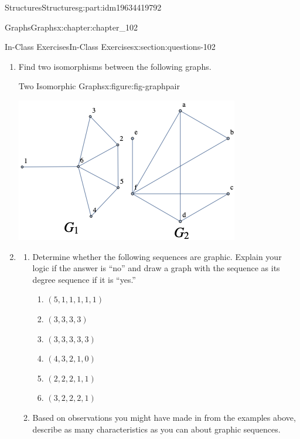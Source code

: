 \documentclass[oneside,10pt,]{book}
\numberwithin{equation}{section}
\begin{document}
\begin{partptx}{Structures}{}{Structures}{}{}{g:part:idm19634419792}
\begin{chapterptx}{Graphs}{}{Graphs}{}{}{x:chapter:chapter_102}
\begin{sectionptx}{In-Class Exercises}{}{In-Class Exercises}{}{}{x:section:questions-102}
\begin{enumerate}[label=\arabic*.]
\begin{figureptx}{A model for bit strings with no consecutive 1's}{x:figure:fig-directed-graph-ex1}{}
\begin{image}{0.15}{0.7}{0.15}
\end{image}%
\tcblower
\end{figureptx}%
This graph produces bit strings that contain no consecutive 1's.   Draw a graph similar to it that produces bit strings containing no more than two consecutive 1's.%
\item{}Find two isomorphisms between the following graphs.%
\begin{figureptx}{Two Isomorphic Graphs}{x:figure:fig-graphpair}{}%
\begin{image}{0.15}{0.7}{0.15}%
\includegraphics[width=\linewidth]{images/fig-graphpair.png}
\end{image}%
\tcblower
\end{figureptx}%
\item{}%
\begin{enumerate}[label=(\alph*)]
\item{}Determine whether the following sequences are graphic. Explain your logic if the answer is ``no'' and draw a graph with the sequence as its degree sequence if it is ``yes.''%
\begin{enumerate}[label=\roman*]
\item{}\(\displaystyle (5,1,1,1,1,1)\)%
\item{}\(\displaystyle (3,3,3,3)\)%
\item{}\(\displaystyle (3,3,3,3,3)\)%
\item{}\(\displaystyle (4,3,2,1,0)\)%
\item{}\(\displaystyle (2,2,2,1,1)\)%
\item{}\(\displaystyle (3,2,2,2,1)\)%
\end{enumerate}
%
\item{}Based on observations you might have made in from the examples above, describe as many characteristics as you can about graphic sequences.%

\end{enumerate}
\end{enumerate}
\end{sectionptx}
\end{chapterptx}
\end{partptx}
\end{document}
